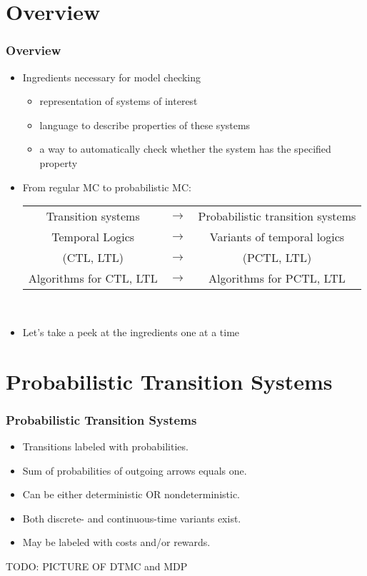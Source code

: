 \documentclass[handout]{beamer}
\begin{document}
\section{Overview}
\begin{frame}
\frametitle{Overview}
\begin{itemize}[<+->]
\item Ingredients necessary for model checking
\begin{itemize}
\item representation of systems of interest
\item language to describe properties of these systems
\item a way to automatically check whether the system has the specified property
\end{itemize}
\item From regular MC to probabilistic MC:\\\vspace{5mm}
\begin{tabular}{ccc}
Transition systems & \(\longrightarrow\) & Probabilistic transition systems \\
Temporal Logics & \(\longrightarrow\) & Variants of temporal logics \\
(CTL, LTL) & \(\longrightarrow\) & (PCTL, LTL) \\
Algorithms for CTL, LTL & \(\longrightarrow\) & Algorithms for PCTL, LTL
\end{tabular}\\\vspace{5mm}
\item Let's take a peek at the ingredients one at a time
\end{itemize}
\end{frame}

\section{Probabilistic Transition Systems}
\begin{frame}
\frametitle{Probabilistic Transition Systems}
\begin{itemize}
\item Transitions labeled with probabilities.
\item Sum of probabilities of outgoing arrows equals one.
\item Can be either deterministic OR nondeterministic.
\item Both discrete- and continuous-time variants exist.
\item May be labeled with costs and/or rewards.
\end{itemize}
TODO: PICTURE OF DTMC and MDP
\end{frame}
\end{document}
